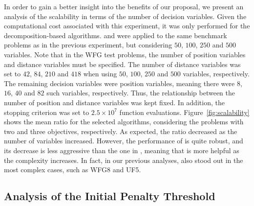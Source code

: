 In order to gain a better insight into the benefits of our proposal, we present an analysis of the scalability in terms of the number 
of decision variables.
%
Given the computational cost associated with this experiment, it was only performed for 
the decomposition-based algorithms.
%
\AVSDMOEAD{} and \MOEADDE{} were applied to the same benchmark problems as in the previous experiment, 
but considering $50$, $100$, $250$ and $500$ variables.
%
Note that in the WFG test problems, the number of position variables and distance variables must be specified.
%
The number of distance variables was set to $42$, $84$, $210$ and $418$ when using $50$, $100$, $250$ and $500$ 
variables, respectively.
%
The remaining decision variables were position variables, meaning there were $8$, $16$, $40$ and $82$ such variables, respectively.
%
Thus, the relationship between the number of position and distance variables was kept fixed.
%
In addition, the stopping criterion was set to $2.5 \times 10^7$ function evaluations.
%
Figure~\ref{fig:scalability} shows the mean \HV{} ratio for the selected algorithms, 
considering the problems with two and three objectives, respectively.
%
As expected, the \HV{} ratio decreased as the number of variables increased.
%
However, the performance of \AVSDMOEAD{} is quite robust, and its decrease is less aggressive than the one in \MOEADDE{},
meaning that \AVSDMOEAD{} is more helpful as the complexity increases.
%
In fact, in our previous analyses, \AVSDMOEAD{} also stood out in the most complex cases, such
as WFG8 and UF5.
%





\subsection{Analysis of the Initial Penalty Threshold}

